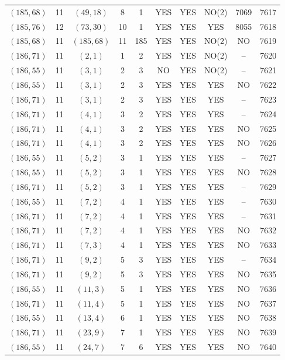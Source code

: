 \begin{longtable}{|c|c|c|c|c|c|c|c|c|c|}
$(185, 68)$ & 11 & $(49, 18)$ & 8 & 1 & YES & YES & NO(2) & 7069 & 7617\\
$(185, 76)$ & 12 & $(73, 30)$ & 10 & 1 & YES & YES & YES & 8055 & 7618\\
$(185, 68)$ & 11 & $(185, 68)$ & 11 & 185 & YES & YES & NO(2) & NO & 7619\\
$(186, 71)$ & 11 & $(2, 1)$ & 1 & 2 & YES & YES & NO(2) & -- & 7620\\
$(186, 55)$ & 11 & $(3, 1)$ & 2 & 3 & NO & YES & NO(2) & -- & 7621\\
$(186, 55)$ & 11 & $(3, 1)$ & 2 & 3 & YES & YES & YES & NO & 7622\\
$(186, 71)$ & 11 & $(3, 1)$ & 2 & 3 & YES & YES & YES & -- & 7623\\
$(186, 71)$ & 11 & $(4, 1)$ & 3 & 2 & YES & YES & YES & -- & 7624\\
$(186, 71)$ & 11 & $(4, 1)$ & 3 & 2 & YES & YES & YES & NO & 7625\\
$(186, 71)$ & 11 & $(4, 1)$ & 3 & 2 & YES & YES & YES & NO & 7626\\
$(186, 55)$ & 11 & $(5, 2)$ & 3 & 1 & YES & YES & YES & -- & 7627\\
$(186, 55)$ & 11 & $(5, 2)$ & 3 & 1 & YES & YES & YES & NO & 7628\\
$(186, 71)$ & 11 & $(5, 2)$ & 3 & 1 & YES & YES & YES & -- & 7629\\
$(186, 55)$ & 11 & $(7, 2)$ & 4 & 1 & YES & YES & YES & -- & 7630\\
$(186, 71)$ & 11 & $(7, 2)$ & 4 & 1 & YES & YES & YES & -- & 7631\\
$(186, 71)$ & 11 & $(7, 2)$ & 4 & 1 & YES & YES & YES & NO & 7632\\
$(186, 71)$ & 11 & $(7, 3)$ & 4 & 1 & YES & YES & YES & NO & 7633\\
$(186, 71)$ & 11 & $(9, 2)$ & 5 & 3 & YES & YES & YES & -- & 7634\\
$(186, 71)$ & 11 & $(9, 2)$ & 5 & 3 & YES & YES & YES & NO & 7635\\
$(186, 55)$ & 11 & $(11, 3)$ & 5 & 1 & YES & YES & YES & NO & 7636\\
$(186, 71)$ & 11 & $(11, 4)$ & 5 & 1 & YES & YES & YES & NO & 7637\\
$(186, 55)$ & 11 & $(13, 4)$ & 6 & 1 & YES & YES & YES & NO & 7638\\
$(186, 71)$ & 11 & $(23, 9)$ & 7 & 1 & YES & YES & YES & NO & 7639\\
$(186, 55)$ & 11 & $(24, 7)$ & 7 & 6 & YES & YES & YES & NO & 7640\\

\end{longtable}
